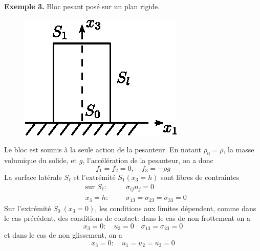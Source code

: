 \textbf{Exemple 3.} Bloc pesant posé sur un plan rigide.

\begin{figure}
\begin{center}
    \includegraphics{../images/T1_Ch04-0004}
\end{center}
\end{figure}
Le bloc est soumis à la seule action de la pesanteur.
En notant $\rho_0 = \rho$, la masse volumique du solide, et $g$, l'accélération de la pesanteur, on a donc
\begin{equation}
    f_1 = f_2 = 0, \quad f_3 = -\rho g
    \label{eq:Ch04-017}
\end{equation}
La surface latérale $S_\ell$ et l'extrémité $S_1(x_3=h)$ sont libres de contraintes
\begin{equation}
    \begin{aligned}
        &\text{sur } S_\ell:\quad && \sigma_{ij} n_j = 0 \\
        &x_3 = h: && \sigma_{13} = \sigma_{23} = \sigma_{33} = 0
    \end{aligned}
    \label{eq:Ch04-018}
\end{equation}
Sur l'extrémité $S_0\ (x_3=0)$, les conditions aux limites dépendent, comme dans le cas précédent, des conditions de contact: dans le cas de non frottement on a
\begin{equation}
    x_3 = 0: \quad u_3 = 0 \quad \sigma_{13} = \sigma_{23} = 0
    \label{eq:Ch04-019}
\end{equation}
et dans le cas de non glissement, on a 
\begin{equation}
    x_3 = 0: \quad u_1 = u_2 = u_3 = 0
    \label{eq:Ch04-020}
\end{equation}

